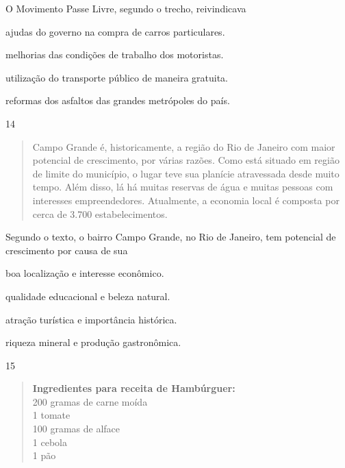 \noindent{}O Movimento Passe Livre, segundo o trecho, reivindicava

\begin{escolha}
\item ajudas do governo na compra de carros particulares.

\item melhorias das condições de trabalho dos motoristas.

\item utilização do transporte público de maneira gratuita.

\item reformas dos asfaltos das grandes metrópoles do país.
\end{escolha}


\num{14}

\begin{quote}
Campo Grande é, historicamente, a região do Rio de Janeiro com maior
potencial de crescimento, por várias razões. Como está situado em região de limite do município, o lugar teve sua planície atravessada desde muito tempo. Além disso, lá há muitas reservas de água e muitas pessoas com interesses empreendedores. Atualmente, a economia local é composta por cerca de 3.700 estabelecimentos. 
\end{quote}

Segundo o texto, o bairro Campo Grande, no Rio de Janeiro, tem potencial
de crescimento por causa de sua

\begin{escolha}
\item boa localização e interesse econômico.

\item qualidade educacional e beleza natural.

\item atração turística e importância histórica.

\item riqueza mineral e produção gastronômica.
\end{escolha}


\num{15}

\begin{quote}
\textbf{Ingredientes para receita de Hambúrguer:}\\
200 gramas de carne moída\\
1 tomate\\
100 gramas de alface\\
1 cebola\\
1 pão
\end{quote}

